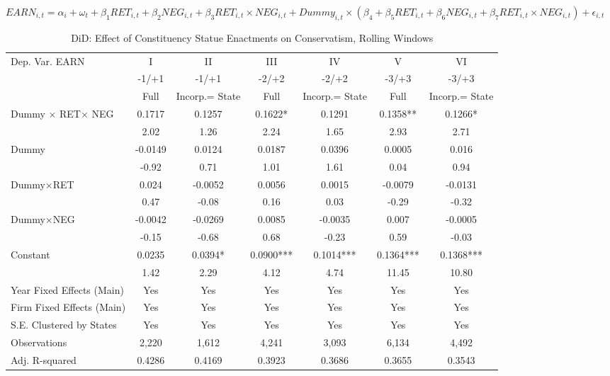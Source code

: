 \begin{landscape}
	\begin{table}[H]
		\centering
		\caption{DiD: Effect of Constituency Statue Enactments on Conservatism, Rolling Windows}
		$EARN_{i,t}=\alpha_i+\omega_t+\beta_1RET_{i,t}+\beta_2NEG_{i,t}+\beta_3RET_{i,t}\times NEG_{i,t}+Dummy_{i,t}\times (\beta_4+\beta_5RET_{i,t}+\beta_6NEG_{i,t}+\beta_7RET_{i,t}\times NEG_{i,t})+\epsilon_{i,t}$
		\begin{tabular}{lcccccc}
			\toprule
			\toprule
			Dep. Var. EARN & I & II & III & IV & V & VI \\
			& -1/+1 &  -1/+1 & -2/+2 & -2/+2 & -3/+3 & -3/+3 \\
			& Full & Incorp.= State & Full & Incorp.= State & Full & Incorp.= State \\
			\midrule
			\rowcolor[rgb]{ .906,  .902,  .902} Dummy $\times$ RET$\times$ NEG & 0.1717 & 0.1257 & 0.1622* & 0.1291 & 0.1358** & 0.1266* \\
			& 2.02  & 1.26  & 2.24  & 1.65  & 2.93  & 2.71 \\
			Dummy & -0.0149 & 0.0124 & 0.0187 & 0.0396 & 0.0005 & 0.016 \\
			& -0.92 & 0.71 & 1.01 & 1.61 & 0.04 & 0.94 \\
			Dummy$\times$RET & 0.024 & -0.0052 & 0.0056 & 0.0015 & -0.0079 & -0.0131 \\
			& 0.47 & -0.08 & 0.16 & 0.03 & -0.29 & -0.32 \\
			Dummy$\times$NEG & -0.0042 & -0.0269 & 0.0085 & -0.0035 & 0.007 & -0.0005 \\
			& -0.15 & -0.68 & 0.68 & -0.23 & 0.59 & -0.03 \\
			Constant & 0.0235 & 0.0394* & 0.0900*** & 0.1014*** & 0.1364*** & 0.1368*** \\
			& 1.42 & 2.29 & 4.12 & 4.74 & 11.45 & 10.80 \\
			Year Fixed Effects (Main) & Yes & Yes & Yes & Yes & Yes & Yes \\
			Firm Fixed Effects (Main) & Yes & Yes & Yes & Yes & Yes & Yes \\
			S.E. Clustered by States & Yes & Yes & Yes & Yes & Yes & Yes \\
			Observations & 2,220 & 1,612 & 4,241 & 3,093 & 6,134 & 4,492 \\
			Adj. R-squared & 0.4286 & 0.4169 & 0.3923 & 0.3686 & 0.3655 & 0.3543 \\
			\bottomrule
			\bottomrule
		\end{tabular}%
		\label{tab:addlabel}%
	\end{table}%
	

\end{landscape}
